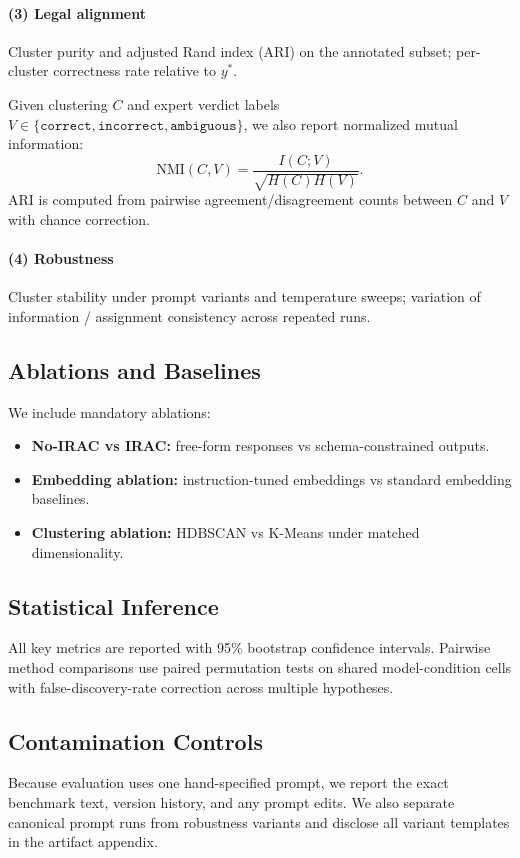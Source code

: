 \documentclass[11pt]{article}
\begin{document}
\paragraph{(3) Legal alignment}
Cluster purity and adjusted Rand index (ARI) on the annotated subset; per-cluster correctness rate relative to $y^\ast$.

Given clustering $C$ and expert verdict labels $V\in\{\texttt{correct},\texttt{incorrect},\texttt{ambiguous}\}$, we also report normalized mutual information:
\[
\mathrm{NMI}(C,V)=\frac{I(C;V)}{\sqrt{H(C)H(V)}}.
\]
ARI is computed from pairwise agreement/disagreement counts between $C$ and $V$ with chance correction.

\paragraph{(4) Robustness}
Cluster stability under prompt variants and temperature sweeps; variation of information / assignment consistency across repeated runs.

\subsection{Ablations and Baselines}
We include mandatory ablations:
\begin{itemize}[leftmargin=1.5em]
    \item \textbf{No-IRAC vs IRAC:} free-form responses vs schema-constrained outputs.
    \item \textbf{Embedding ablation:} instruction-tuned embeddings vs standard embedding baselines.
    \item \textbf{Clustering ablation:} HDBSCAN vs K-Means under matched dimensionality.
\end{itemize}

\subsection{Statistical Inference}
All key metrics are reported with 95\% bootstrap confidence intervals. Pairwise method comparisons use paired permutation tests on shared model-condition cells with false-discovery-rate correction across multiple hypotheses.

\subsection{Contamination Controls}
Because evaluation uses one hand-specified prompt, we report the exact benchmark text, version history, and any prompt edits. We also separate canonical prompt runs from robustness variants and disclose all variant templates in the artifact appendix.
\end{document}
